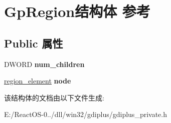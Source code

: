 \hypertarget{struct_gp_region}{}\section{Gp\+Region结构体 参考}
\label{struct_gp_region}
\subsection*{Public 属性}
\begin{DoxyCompactItemize}
\item 
\mbox{\label{struct_gp_region_a5f741e0a48287f8fde6a9f5acac26ef4}} 
D\+W\+O\+RD {\bfseries num\+\_\+children}
\item 
\mbox{\label{struct_gp_region_a4b49aaa31ace9178487694de2a5680e1}} 
\hyperlink{structregion__element}{region\+\_\+element} {\bfseries node}
\end{DoxyCompactItemize}


该结构体的文档由以下文件生成\+:\begin{DoxyCompactItemize}
\item 
E\+:/\+React\+O\+S-\/0../dll/win32/gdiplus/gdiplus\+\_\+private.\+h\end{DoxyCompactItemize}
